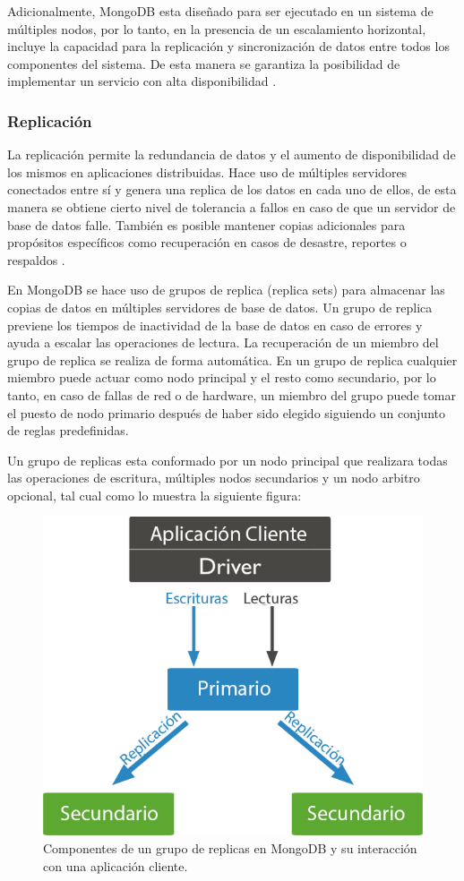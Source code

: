 Adicionalmente, MongoDB esta diseñado para ser ejecutado en un sistema de múltiples nodos, por lo tanto,
en la presencia de un escalamiento horizontal, incluye la capacidad para la replicación
y sincronización de datos entre todos los componentes del sistema. De esta manera se garantiza la posibilidad
de implementar un servicio con alta disponibilidad \cite{10}.

\subsubsection{Replicación}

La replicación permite la redundancia de datos y el aumento de disponibilidad de los mismos en aplicaciones distribuidas.
Hace uso de múltiples servidores conectados entre sí y genera una replica de los datos en cada uno de ellos, de
esta manera se obtiene cierto nivel de tolerancia a fallos en caso de que un servidor de base de datos falle.
También es posible mantener copias adicionales para propósitos específicos como recuperación en casos de desastre,
reportes o respaldos \cite{11}.

En MongoDB se hace uso de grupos de replica (replica sets) para almacenar las copias de datos en múltiples
servidores de base de datos. Un grupo de replica previene los tiempos de inactividad de la base de datos
en caso de errores y ayuda a escalar las operaciones de lectura. La recuperación de un miembro del grupo de
replica se realiza de forma automática. En un grupo de replica cualquier miembro puede actuar como nodo principal
y el resto como secundario, por lo tanto, en caso de fallas de red o de hardware, un miembro del grupo
puede tomar el puesto de nodo primario después de haber sido elegido siguiendo un conjunto de reglas predefinidas.

Un grupo de replicas esta conformado por un nodo principal que realizara todas las operaciones de escritura, múltiples nodos
secundarios y un nodo arbitro opcional, tal cual como lo muestra la siguiente figura:

\begin{figure}[H]
	\centering
		\includegraphics[width=.6\textwidth]{figures/replicas}
	\caption{Componentes de un grupo de replicas en MongoDB y su interacción con una aplicación cliente.}
	\label{fig:replicas}
\end{figure}

